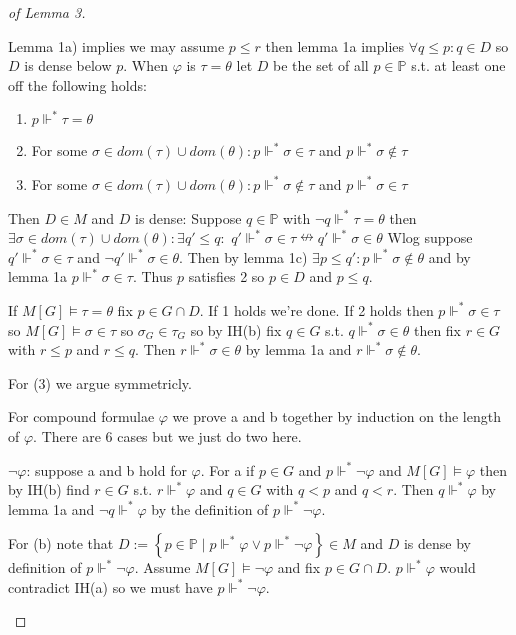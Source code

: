 \documentclass{scrartcl}
\newcommand{\set}[1]{\left\{#1\right\}}
\theoremstyle{definition}
\theoremstyle{plain}
\theoremstyle{remark}
\begin{document}
\begin{proof}[of Lemma 3]
\begin{enumerate}[(a)]
			Lemma 1a) implies we may assume $p \leq r$ then lemma 1a implies $\forall q \leq p: q \in D$ so $D$ is dense below $p$.
			When $\varphi$ is $\tau = \theta$ let $D$ be the set of all $p \in \mathbb{P}$ s.t. at least one off the following holds:
			\begin{enumerate}[1.]
				\item $p \Vdash^* \tau = \theta$
				\item For some $\sigma \in dom(\tau) \cup dom(\theta):  p \Vdash^* \sigma \in \tau$
				and $p\Vdash^* \sigma \notin \tau$
				\item For some $\sigma \in dom(\tau) \cup dom(\theta):  p \Vdash^* \sigma \notin \tau$
				and $p\Vdash^* \sigma \in \tau$
			\end{enumerate}
			Then $D \in M$ and $D$ is dense: Suppose $q \in \mathbb{P}$ with
			$\lnot q \Vdash^* \tau = \theta$ then $\exists \sigma \in dom(\tau) \cup dom(\theta): \exists q' \leq q: $
			$q' \Vdash^* \sigma \in \tau \nleftrightarrow q' \Vdash^* \sigma \in \theta$
			Wlog suppose $q' \Vdash^* \sigma \in \tau$ and $\lnot q' \Vdash^* \sigma \in \theta$.
			Then by lemma 1c) $\exists p \leq q': p \Vdash^* \sigma \notin \theta$ and
			by lemma 1a $p \Vdash^* \sigma \in \tau$. Thus $p$ satisfies 2 so $p \in D$
			and $p \leq q$.

			If $M[G] \vDash \tau = \theta$ fix $p \in G \cap D$. If 1 holds we're done.
			If 2 holds then $p\Vdash^* \sigma \in \tau$ so $M[G] \vDash\sigma \in \tau$
			so $\sigma_G \in \tau_G$ so by IH(b) fix $q \in G$ s.t. $q \Vdash^* \sigma \in \theta$
			then fix $r \in G$ with $r \leq p$ and $r \leq q$. Then $r \Vdash^* \sigma \in \theta$
			by lemma 1a and $r \Vdash^* \sigma \notin \theta$.

			For (3) we argue symmetricly.

			For compound formulae $\varphi$ we prove a and b together by induction 
			on the length of $\varphi$. There are 6 cases but we just do two here.
			
			$\lnot \varphi$: suppose a and b hold for $\varphi$. For a if $p \in G$
			and $p \Vdash^* \lnot \varphi$ and $M[G] \vDash \varphi$ then
			by IH(b) find $r \in G$ s.t. $r \Vdash^* \varphi$ and $q \in G$ with
			$q < p$ and $q < r$. Then $q \Vdash^* \varphi$ by lemma 1a and 
			$\lnot q \Vdash^* \varphi$ by the definition of $p \Vdash^* \lnot \varphi$.

			For (b) note that $D := \set{p \in \mathbb{P} \mid p \Vdash^* \varphi \lor p \Vdash^* \lnot \varphi} \in M$
			and $D$ is dense by definition of $p \Vdash^* \lnot \varphi$.
			Assume $M[G] \vDash \lnot \varphi$ and fix $p \in G \cap D$.
			$p \Vdash^* \varphi$  would contradict IH(a) so we must have $p \Vdash^* \lnot \varphi$.


\end{enumerate}
\end{proof}
\end{document}
